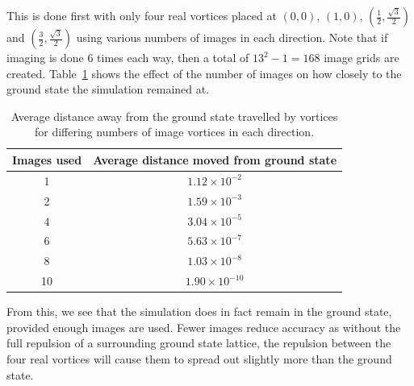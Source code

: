 \documentclass{article}
\numberwithin{equation}{section}
\begin{document}
This is done first with only four real vortices placed at $(0, 0)$, $(1, 0)$, $(\frac{1}{2}, \frac{\sqrt{3}}{2})$ and $(\frac{3}{2}, \frac{\sqrt{3}}{2})$ using various numbers of images in each direction. Note that if imaging is done 6 times each way, then a total of $13^2-1=168$ image grids are created. Table~\ref{tab:dist_from_images} shows the effect of the number of images on how closely to the ground state the simulation remained at.
\begin{table}[htb]
    \centering
    \begin{tabular}{c|c}
        Images used & Average distance moved from ground state \\
        \hline
        1 & $1.12\times 10^{-2}$ \\
        2 & $1.59\times 10^{-3}$ \\
        4 & $3.04\times 10^{-5}$ \\
        6 & $5.63\times 10^{-7}$ \\
        8 & $1.03\times 10^{-8}$ \\
        10 & $1.90\times 10^{-10}$ \\
    \end{tabular}
    \caption{Average distance away from the ground state travelled by vortices for differing numbers of image vortices in each direction.}
    \label{tab:dist_from_images}
\end{table}
From this, we see that the simulation does in fact remain in the ground state, provided enough images are used. Fewer images reduce accuracy as without the full repulsion of a surrounding ground state lattice, the repulsion between the four real vortices will cause them to spread out slightly more than the ground state.
\end{document}
